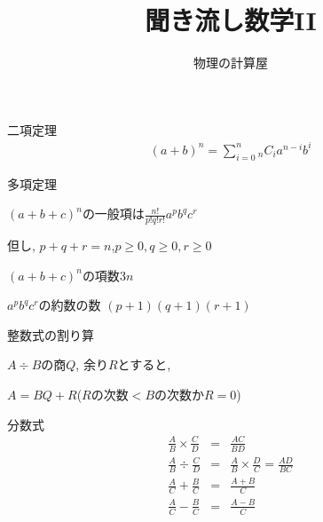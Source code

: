\documentclass[aspectratio=169, 12pt]{beamer} %
\begin{document}
\title{聞き流し数学I\hspace{-1.2pt}I}
\author[物理の計算屋]{物理の計算屋}
\date{}
\frame{\maketitle} %
\begin{frame}{二項定理}
    \begin{eqnarray*}
        (a+b)^n=\sum_{i=0}^n {}_nC_i a^{n-i}b^i
    \end{eqnarray*}
\end{frame}
\begin{frame}{多項定理}
    \begin{center}
        $(a+b+c)^n$の一般項は$\frac{n!}{p!q!r!}a^pb^qc^r$ \par
        但し, $p+q+r=n$,\space$p\geq0, q\geq0, r\geq0$
    \end{center}
    \begin{center}
        $(a+b+c)^n$の項数$3n$ \par
        $a^pb^qc^r$の約数の数 $(p+1)(q+1)(r+1)$
    \end{center}
\end{frame}
\begin{frame}{整数式の割り算}
    \begin{center}
        $A \div B$の商$Q$, 余り$R$とすると, \par
        $A=BQ+R$\space ($R$の次数\space$<B$の次数\space か\space$R=0$)
    \end{center}
\end{frame}
\begin{frame}{分数式}
    \begin{eqnarray*}
        \frac{A}{B}\times\frac{C}{D} &=& \frac{AC}{BD} \\
        \frac{A}{B}\div \frac{C}{D}&=&\frac{A}{B}\times \frac{D}{C}=\frac{AD}{BC} \\
        \frac{A}{C}+ \frac{B}{C}&=&\frac{A+B}{C} \\
        \frac{A}{C}-\frac{B}{C}&=&\frac{A-B}{C}
    \end{eqnarray*}
\end{frame}
\end{document}
